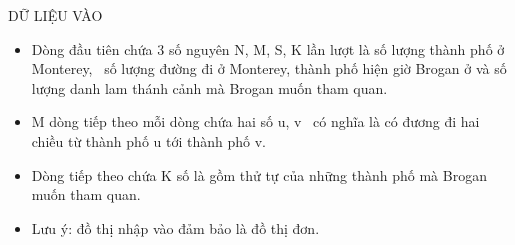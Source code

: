 DỮ LIỆU VÀO
\begin{itemize}
	\item Dòng đầu tiên chứa 3 số nguyên N, M, S, K lần lượt là số lượng thành phố ở Monterey,  số lượng đường đi ở Monterey, thành phố hiện giờ Brogan ở và số lượng danh lam thánh cảnh mà Brogan muốn tham quan.
	\item M dòng tiếp theo mỗi dòng chứa hai số u, v  có nghĩa là có đương đi hai chiều từ thành phố u tới thành phố v.
	\item Dòng tiếp theo chứa K số là gồm thử tự của những thành phố mà Brogan muốn tham quan.
	\item Lưu ý: đồ thị nhập vào đảm bảo là đồ thị đơn.
\end{itemize}